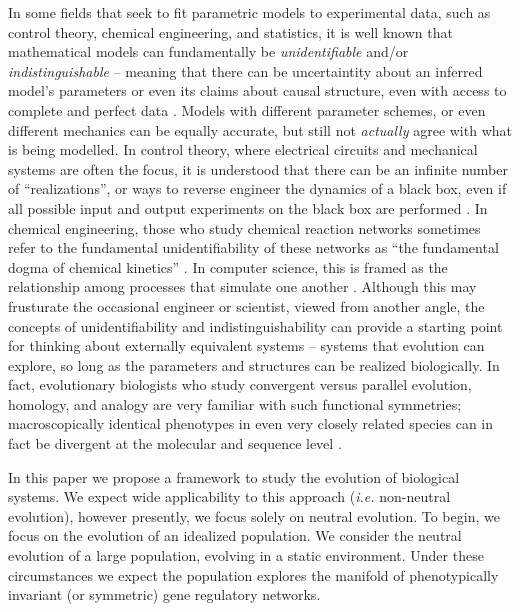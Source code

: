 \documentclass{article}
\newcommand{\1}{\mathbbm{1}}
\begin{document}
In some fields that seek to fit parametric models to experimental data, such as control
theory, chemical engineering, and statistics, it is well known that mathematical models
can fundamentally be \emph{unidentifiable} and/or \emph{indistinguishable} -- meaning that 
there can be uncertaintity about an inferred model's parameters or even its claims about
causal structure, even with access to complete and perfect data \citep{bellman1970structural, grewal1976identifiability, walter1984structural}. Models with different 
parameter schemes, or even different mechanics can be equally accurate, but still not
\emph{actually} agree with what is being modelled. In control theory, where electrical 
circuits and mechanical systems are often the focus, it is understood that there can be an 
infinite number of ``realizations'', or ways to reverse engineer the dynamics of a black box,
even if all possible input and output experiments on the black box are performed \citep{kalman1963mathematical, anderson1966equivalence, zadeh1976linear}. In chemical
engineering, those who study chemical reaction networks sometimes refer to the fundamental
unidentifiability of these networks as ``the fundamental dogma of chemical kinetics'' \citep{craciun2008identifiability}. In computer science, this is framed as the relationship among processes that simulate one another \citep{van2004equivalence}.
Although this may frusturate the occasional engineer or scientist, viewed from another angle,
the concepts of unidentifiability and indistinguishability can provide a starting point for
thinking about externally equivalent systems -- systems that evolution can explore, so long
as the parameters and structures can be realized biologically. In fact, evolutionary
biologists who study convergent versus parallel evolution, homology, and analogy are very familiar with such functional symmetries; macroscopically identical phenotypes in even very closely related species can in fact be divergent at the molecular and sequence level \citep{true2001developmental, tsong2006evolution, hare2008sepsid, vierstra2014mouse, stergachis2014conservation, taylor2016diverse, matsui2015regulatory}.

  In this paper we propose a framework to study the evolution of biological systems. We expect wide applicability to this approach (\emph{i.e.} non-neutral evolution), however presently, we focus solely on neutral evolution. To begin, we focus on the evolution of an idealized population. We consider the neutral evolution of a large population, evolving in a static environment. Under these circumstances we expect the population explores the manifold of phenotypically invariant (or symmetric) gene regulatory networks.
\end{document}
